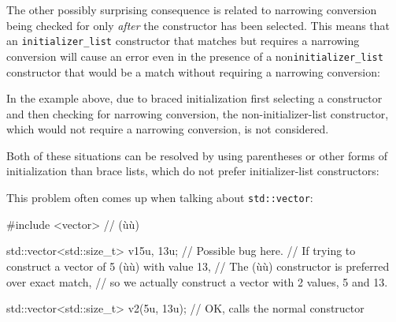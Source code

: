 The other possibly surprising consequence is related to narrowing
conversion being checked for only \emph{after} the constructor has been
selected. This means that an \lstinline!initializer_list! constructor that
matches but requires a narrowing conversion will cause an error even in
the presence of a non\lstinline!initializer_list! constructor that would
be a match without requiring a narrowing conversion:

    

\noindent In the example above, due to braced initialization first selecting a
constructor and then checking for narrowing conversion, the
non-initializer-list constructor, which would not require a narrowing
conversion, is not considered.

Both of these situations can be resolved by using parentheses or other
forms of initialization than brace lists, which do not prefer
initializer-list constructors:

    
\noindent This problem often comes up when talking about \lstinline!std::vector!:

\begin{emcppshiddenlisting}[emcppsbatch=e20]
#include <vector>     // (ù{}ù)
\end{emcppshiddenlisting}
\begin{emcppslisting}[emcppsbatch=e20]
std::vector<std::size_t> v1{5u, 13u};  // Possible bug here.
  // If trying to construct a vector of 5 (ù{}ù) with value 13,
  // The (ù{}ù) constructor is preferred over exact match,
  // so we actually construct a vector with 2 values, 5 and 13.

std::vector<std::size_t> v2(5u, 13u);  // OK, calls the normal constructor
\end{emcppslisting}
    

